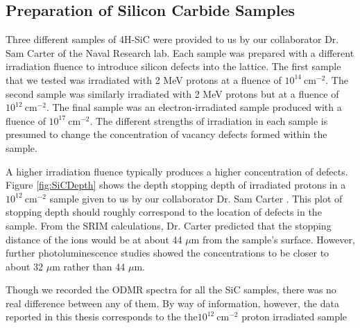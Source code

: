 \documentclass[oneside, noacknowlegments]{BYUPhys}
\begin{document}
\subsection{Preparation of Silicon Carbide Samples}
\label{sec:SiCSamples}

Three different samples of 4H-SiC were provided to us by our collaborator Dr. Sam Carter of the Naval Research lab. Each sample was prepared with a different irradiation fluence to introduce silicon defects into the lattice. The first sample that we tested was irradiated with 2 MeV protons at a fluence of $10^{14}~\text{cm}^{-2}$. The second sample was similarly irradiated with 2 MeV protons but at a fluence of $10^{12}~\text{cm}^{-2}$. The final sample was an electron-irradiated sample produced with a fluence of $10^{17}~\text{cm}^{-2}$. The different strengths of irradiation in each sample is presumed to change the concentration of vacancy defects formed within the sample.

A higher irradiation fluence typically produces a higher concentration of defects. Figure \ref{fig:SiCDepth} shows the depth stopping depth of irradiated protons in a $10^{12}~\text{cm}^{-2}$ sample given to us by our collaborator Dr. Sam Carter \cite{RefWorks:doc:5892964ee4b0499fa95c5108}. This plot of stopping depth should roughly correspond to the location of defects in the sample. From the SRIM calculations, Dr. Carter predicted that the stopping distance of the ions would be at about 44 $\mu$m from the sample's surface. However, further photoluminescence studies showed the concentrations to be closer to about 32 $\mu$m rather than 44 $\mu$m. 

Though we recorded the ODMR spectra for all the SiC samples, there was no real difference between any of them. By way of information, however, the data reported in this thesis corresponds to the the$10^{12}~\text{cm}^{-2}$ proton irradiated sample
\end{document}
